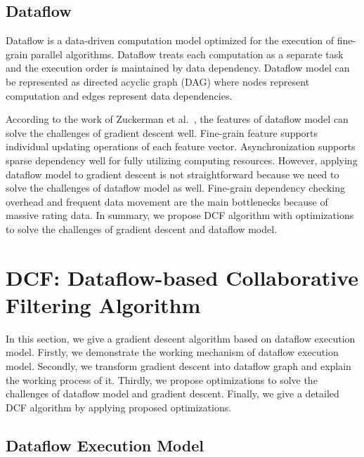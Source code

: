 \documentclass{llncs}
\begin{document}
\vspace{-10pt}
\subsection{Dataflow}
\vspace{-5pt}

Dataflow \cite{dataflow} is a data-driven computation model optimized for the execution of fine-grain parallel algorithms. Dataflow treats each computation as a separate task and the execution order is maintained by data dependency.
Dataflow model can be represented as directed acyclic graph (DAG) where nodes
represent computation and edges represent data dependencies.

According to the work of Zuckerman et al.~\cite{codelet},
the features of dataflow model can solve the challenges of gradient descent well. Fine-grain feature supports individual updating operations of each feature vector. Asynchronization supports sparse dependency well for fully utilizing computing resources. However, applying dataflow model to gradient descent is not straightforward because we need to solve the challenges of dataflow model as well. Fine-grain dependency checking overhead and frequent data movement are the main bottlenecks because of massive rating data. In summary, we propose DCF algorithm with optimizations to solve the challenges of gradient descent and dataflow model.

\vspace{-10pt}
\section{DCF: Dataflow-based Collaborative Filtering Algorithm}
\vspace{-10pt}

In this section, we give a gradient descent algorithm based on dataflow execution model. Firstly, we demonstrate the working mechanism of dataflow execution model. Secondly, we transform gradient descent into dataflow graph and explain the working process of it. Thirdly, we propose optimizations to solve the challenges of dataflow model and gradient descent. Finally, we give a detailed DCF algorithm by applying proposed optimizations.
\vspace{-10pt}
\subsection{Dataflow Execution Model}
\vspace{-5pt}
\end{document}
